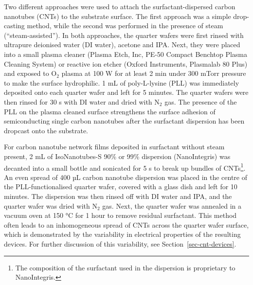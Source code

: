 \documentclass[
  a4paper,
]{scrbook}
\begin{document}
Two different approaches were used to attach the surfactant-dispersed
carbon nanotubes (CNTs) to the substrate surface. The first approach was
a simple drop-casting method, while the second was performed in the
presence of steam (``steam-assisted''). In both approaches, the quarter
wafers were first rinsed with ultrapure deionised water (DI water),
acetone and IPA. Next, they were placed into a small plasma cleaner
(Plasma Etch, Inc, PE-50 Compact Benchtop Plasma Cleaning System) or
reactive ion etcher (Oxford Instruments, Plasmalab 80 Plus) and exposed
to O\(_2\) plasma at 100 W for at least 2 min under 300 mTorr pressure
to make the surface hydrophilic. 1 mL of poly-L-lysine (PLL) was
immediately deposited onto each quarter wafer and left for 5 minutes.
The quarter wafers were then rinsed for 30 s with DI water and dried
with N\(_2\) gas. The presence of the PLL on the plasma cleaned surface
strengthens the surface adhesion of semiconducting single carbon
nanotubes after the surfactant dispersion has been dropcast onto the
substrate.

For carbon nanotube network films deposited in surfactant without steam
present, 2 mL of IsoNanotubes-S 90\% or 99\% dispersion (NanoIntegris)
was decanted into a small bottle and sonicated for 5 s to break up
bundles of CNTs\footnote{The composition of the surfactant used in the
  dispersion is proprietary to NanoIntegris.}. An even spread of 400 µL
carbon nanotube dispersion was placed in the centre of the
PLL-functionalised quarter wafer, covered with a glass dish and left for
10 minutes. The dispersion was then rinsed off with DI water and IPA,
and the quarter wafer was dried with N\(_2\) gas. Next, the quarter
wafer was annealed in a vacuum oven at 150 °C for 1 hour to remove
residual surfactant. This method often leads to an inhomogeneous spread
of CNTs across the quarter wafer surface, which is demonstrated by the
variability in electrical properties of the resulting devices. For
further discussion of this variability, see
Section~\ref{sec-cnt-devices}.
\end{document}
